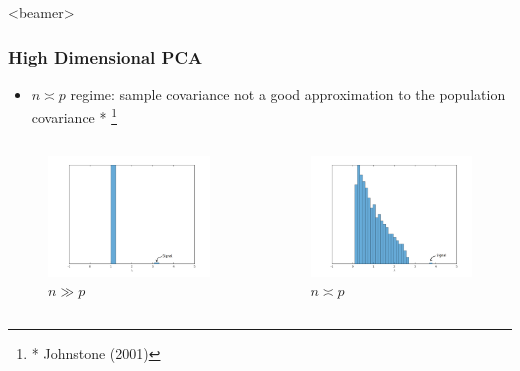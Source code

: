 \documentclass{beamer}
\newcommand\blfootnote[1]{%
  \begingroup
  \renewcommand\thefootnote{}\footnote{#1}%
  \addtocounter{footnote}{-1}%
  \endgroup
}
\begin{document}
\begin{frame}<beamer>
\frametitle{High Dimensional PCA}
\begin{itemize}[]
\item $n \asymp p$ regime: sample covariance not a good approximation to the population covariance * \blfootnote{* Johnstone (2001)}
\end{itemize}
\begin{columns}
\begin{figure}
\centering
\includegraphics[width=1\linewidth]{figures/mpplot_clt.png}
\caption{$n \gg p$}
\end{figure}
\begin{figure}
\includegraphics[width=1\linewidth]{figures/mpplot_high.png}
\caption{$n \asymp p$}
\label{fig:shrinkage}
\end{figure}
\end{columns}
\end{frame}
\end{document}
